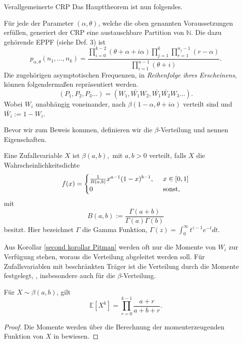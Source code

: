 \begin{section}{Verallgemeinerte CRP}
Das Haupttheorem ist nun folgendes.
\begin{theorem}
    \label{Main theorem CRP}
    Für jede der Parameter $(\alpha,\theta)$, welche die oben genannten Voraussetzungen erfüllen, generiert der CRP eine austauschbare  Partition von $\mathbb{N}$. Die dazu gehörende EPPF (siehe Def. 3) ist 
    \begin{equation}
   p_{\alpha,\theta}(n_1,...,n_k) = \frac{\displaystyle \prod_{i=0}^{k-2}(\theta + \alpha + i\alpha)\prod_{j=1}^{k}\prod_{r=1}^{n_j-1}(r-\alpha)}{\displaystyle\prod_{i=1}^{n-1}(\theta  + i)}.
    \end{equation}
    Die zugehörigen asymptotischen Frequenzen, in \textit{Reihenfolge ihres Erscheinens}, können folgendermaßen repräsentiert werden.
    \[
    (P_1,P_2,P_3...) = (W_1,\bar{W_1}W_2,\bar{W_1}\bar{W_2}W_3...).
    \]
    Wobei $W_i$ unabhängig voneinander, nach $\beta(1 - \alpha, \theta + i\alpha)$ verteilt sind und $\bar{W_i}:= 1 - W_i$.
\end{theorem} 
Bevor wir zum Beweis kommen, definieren wir die $\beta$-Verteilung und nennen Eigenschaften.
\begin{Definition}
    \label{definition beta distribution}
    Eine Zufallsvariable $X$ ist $\beta(a,b),$ mit $ a,b > 0 $ verteilt, falls $X$ die Wahrscheinlichkeitsdichte 
    \[
        f(x) =
        \begin{cases}
        \frac{1}{B(a,b)} x^{a-1}(1-x)^{b-1}, \hspace{5pt} &x \in [0,1]  \\
        0 &\textnormal{sonst},
        \end{cases} 
   \]
mit 
\[
    B(a,b):= \frac{\Gamma(a+b)}{\Gamma(a)\Gamma(b)}
\]
besitzt. Hier bezeichnet $\Gamma$ die Gamma Funktion, $\Gamma(z)= \int_{0}^{\infty} t^{z-1}e^{-t}dt$.
\end{Definition}
Aus Korollar \ref{second korollar Pitman} werden oft nur die Momente von $W_i$ zur Verfügung stehen, woraus die Verteilung abgeleitet werden soll. Für Zufallsvariablen mit beschränkten Träger ist die Verteilung durch die Momente festgelegt, \cite[Theorem 30.1]{billingsley1995probability}, insbesondere auch für die $\beta$-Verteilung.
\begin{lemma}
    Für $X \sim \beta(a,b)$, gilt
    \[
    \mathbb{E}[X^k] = \prod_{r=0}^{k-1}\frac{a+r}{a+b  + r}.
    \]
\end{lemma}
\begin{proof}
    Die Momente werden über die Berechnung der momenterzeugenden Funktion von $X$ in \cite[Kapitel 25]{johnson1995continuous} bewiesen. 
\end{proof}


\end{section}
